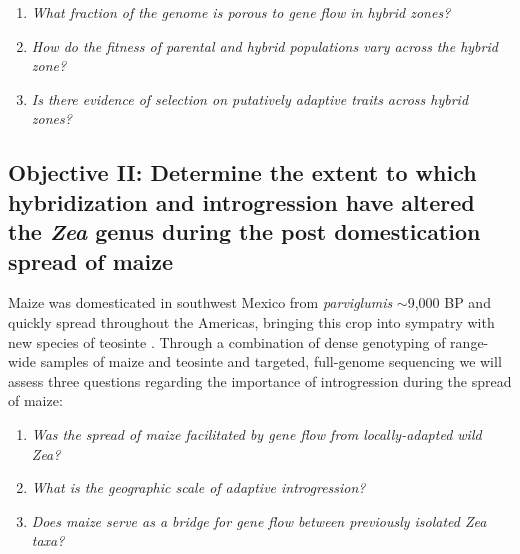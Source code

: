 \begin{enumerate}
\item \emph{What fraction of the genome is porous to gene flow in hybrid zones?}

\item \emph{How do the fitness of parental and hybrid populations vary across the hybrid zone?} 

\item \emph{Is there evidence of selection on putatively adaptive traits across hybrid zones?} 
\end{enumerate}
\vspace{0.5cm}

\subsection*{Objective II: Determine the extent to which hybridization and introgression have altered the \emph{Zea} genus during the post domestication spread of maize}
Maize was domesticated in southwest Mexico from \emph{parviglumis} $\sim$9,000 BP \citep{Matsuoka2002} and quickly spread throughout the Americas, bringing this crop into sympatry with new species of teosinte \citep{Vigouroux2008a}. Through a combination of dense genotyping of range-wide samples of maize and teosinte and targeted, full-genome sequencing we will assess three questions regarding the importance of introgression during the spread of maize:
\begin{enumerate}
\item \emph{Was the spread of maize facilitated by gene flow from locally-adapted wild \emph{Zea}?} 
\item \emph{What is the geographic scale of adaptive introgression?}
\item \emph{Does maize serve as a bridge for gene flow between previously isolated \emph{Zea} taxa?}
\end{enumerate}


